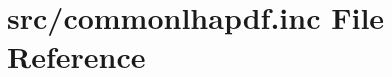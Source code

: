 \hypertarget{commonlhapdf_8inc}{}\section{src/commonlhapdf.inc File Reference}
\label{commonlhapdf_8inc}
